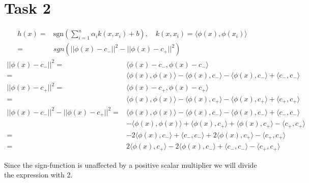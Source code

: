 \documentclass{article}
\begin{document}
\section*{Task 2}
\begin{align}
	h(x) =& \text{sgn}\left( \sum_{i = 1}^{n} \alpha_i k(x,x_i) + b\right), \quad k(x,x_i) = \langle \phi(x), \phi(x_i)\rangle \\
	=& sgn(||\phi(x) - c_-||^2 - ||\phi(x) - c_+||^2 )
\end{align}
\begin{align}
	||\phi(x) - c_-||^2 =& \langle \phi(x) - c_-, \phi(x) - c_- \rangle \\
	=& \langle \phi(x), \phi(x)\rangle -\langle \phi(x), c_-\rangle - \langle \phi(x), c_-\rangle + \langle c_-, c_-\rangle \\
	||\phi(x) - c_+||^2 =& \langle \phi(x) - c_+, \phi(x) - c_+ \rangle \\
	=& \langle \phi(x), \phi(x)\rangle -\langle \phi(x), c_+\rangle - \langle \phi(x), c_+\rangle + \langle c_+, c_+\rangle\\
	||\phi(x) - c_-||^2 - ||\phi(x) - c_+||^2 =& \langle \phi(x), \phi(x)\rangle -\langle \phi(x), c_-\rangle - \langle \phi(x), c_-\rangle + \langle c_-, c_-\rangle\\ & -\langle \phi(x), \phi(x)\rangle +\langle \phi(x), c_+\rangle + \langle \phi(x), c_+\rangle - \langle c_+, c_+\rangle \\
	=& -2\langle \phi(x), c_-\rangle + \langle c_-, c_-\rangle +2\langle \phi(x), c_+\rangle  - \langle c_+, c_+\rangle\\
	=& 2\langle \phi(x), c_+\rangle - 2\langle \phi(x), c_-\rangle + \langle c_-, c_-\rangle - \langle c_+, c_+\rangle \label{eq:2}
\end{align}

Since the sign-function is unaffected by a positive scalar multiplier we will divide the expression with 2.
\end{document}
